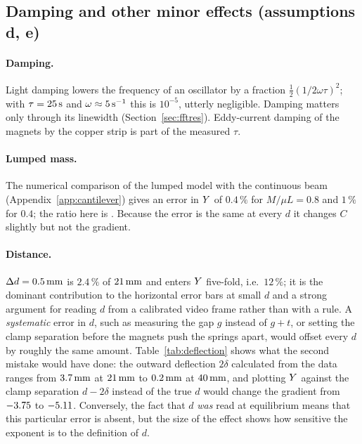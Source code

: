 \subsection{Damping and other minor effects (assumptions d, e)}

\paragraph{Damping.} Light damping lowers the frequency of an oscillator by a fraction $\tfrac12(1/2\omega\tau)^2$; with $\tau=25\,\mathrm{s}$ and $\omega\approx5\,\mathrm{s^{-1}}$ this is $10^{-5}$, utterly negligible. Damping matters only through its linewidth (Section~\ref{sec:fftres}). Eddy-current damping of the magnets by the copper strip is part of the measured $\tau$.

\paragraph{Lumped mass.} The numerical comparison of the lumped model with the continuous beam (Appendix~\ref{app:cantilever}) gives an error in $Y$ of $0.4\,\%$ for $M/\mu L=0.8$ and $1\,\%$ for $0.4$; the ratio here is . Because the error is the same at every $d$ it changes $C$ slightly but not the gradient.

\paragraph{Distance.} $\Delta d=0.5\,\mathrm{mm}$ is $2.4\,\%$ of $21\,\mathrm{mm}$ and enters $Y$ five-fold, i.e.\ $12\,\%$; it is the dominant contribution to the horizontal error bars at small $d$ and a strong argument for reading $d$ from a calibrated video frame rather than with a rule. A \emph{systematic} error in $d$, such as measuring the gap $g$ instead of $g+t$, or setting the clamp separation before the magnets push the springs apart, would offset every $d$ by roughly the same amount. Table~\ref{tab:deflection} shows what the second mistake would have done: the outward deflection $2\delta$ calculated from the data ranges from $3.7\,\mathrm{mm}$ at $21\,\mathrm{mm}$ to $0.2\,\mathrm{mm}$ at $40\,\mathrm{mm}$, and plotting $Y$ against the clamp separation $d-2\delta$ instead of the true $d$ would change the gradient from $-3.75$ to $-5.11$. Conversely, the fact that $d$ \emph{was} read at equilibrium means that this particular error is absent, but the size of the effect shows how sensitive the exponent is to the definition of $d$.

